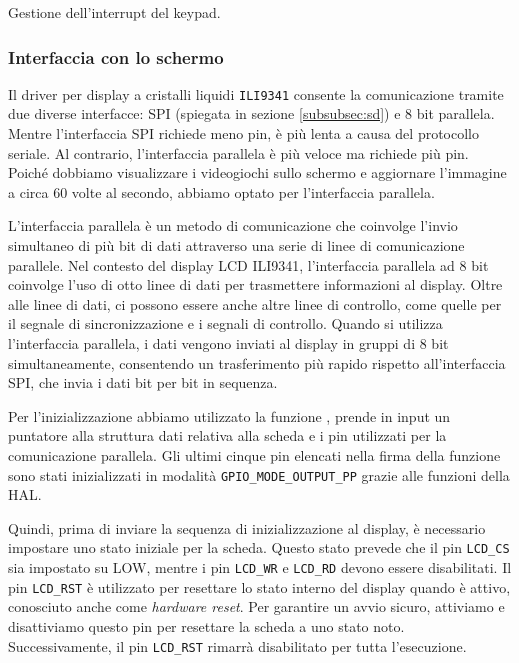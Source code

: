 \documentclass[a4paper]{article}
\begin{document}
\begin{Listing}[h!t] %
    \centering
    \caption{Gestione dell'interrupt del keypad.}
    \label{keypad}
\end{Listing}

\subsubsection{Interfaccia con lo schermo}

Il driver per display a cristalli liquidi \texttt{ILI9341} consente la comunicazione tramite due
diverse interfacce: SPI (spiegata in sezione \ref{subsubsec:sd}) e 8 bit parallela. Mentre
l'interfaccia SPI richiede meno pin, è più lenta a causa del protocollo seriale. Al contrario,
l'interfaccia parallela è più veloce ma richiede più pin. Poiché dobbiamo visualizzare
i videogiochi sullo schermo e aggiornare l'immagine a circa 60 volte al secondo, abbiamo
optato per l'interfaccia parallela.

L'interfaccia parallela è un metodo di comunicazione che coinvolge l'invio simultaneo di più
bit di dati attraverso una serie di linee di comunicazione parallele. Nel contesto del display
LCD ILI9341, l'interfaccia parallela ad 8 bit coinvolge l'uso di otto linee di dati per
trasmettere informazioni al display. Oltre alle linee di dati, ci possono essere anche altre
linee di controllo, come quelle per il segnale di sincronizzazione e i segnali di controllo.
Quando si utilizza l'interfaccia parallela, i dati vengono inviati al display in gruppi di 8 bit
simultaneamente, consentendo un trasferimento più rapido rispetto all'interfaccia SPI,
che invia i dati bit per bit in sequenza.

Per l'inizializzazione abbiamo utilizzato la funzione
{},
prende in input un puntatore alla struttura dati relativa alla scheda e i pin utilizzati per la
comunicazione parallela. Gli ultimi cinque pin elencati nella firma della funzione sono stati
inizializzati in modalità \texttt{GPIO\_MODE\_OUTPUT\_PP} grazie alle funzioni della HAL.

Quindi, prima di inviare la sequenza di inizializzazione al display, è necessario impostare
uno stato iniziale per la scheda. Questo stato prevede che il pin \texttt{LCD\_CS} sia
impostato su LOW, mentre i pin \texttt{LCD\_WR} e \texttt{LCD\_RD} devono essere disabilitati.
Il pin \texttt{LCD\_RST} è utilizzato per resettare lo stato interno del display quando è attivo,
conosciuto anche come \textit{hardware reset}. Per garantire un avvio sicuro, attiviamo e
disattiviamo questo pin per resettare la scheda a uno stato noto. Successivamente,
il pin \texttt{LCD\_RST} rimarrà disabilitato per tutta l'esecuzione.
\end{document}
